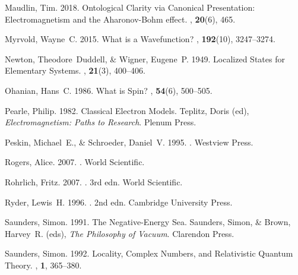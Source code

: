 \documentclass[12pt,secnumarabic,amsmath,amssymb,balancelastpage,nofootinbib]{article}
\begin{document}
\begin{thebibliography}{}
Maudlin, Tim. 2018.
\newblock Ontological Clarity via Canonical Presentation: Electromagnetism and
  the Aharonov-Bohm effect.
, {\bf 20}(6), 465.

Myrvold, Wayne~C. 2015.
\newblock What is a Wavefunction?
, {\bf 192}(10), 3247--3274.

Newton, Theodore~Duddell, \& Wigner, Eugene~P. 1949.
\newblock Localized States for Elementary Systems.
, {\bf 21}(3), 400--406.

Ohanian, Hans~C. 1986.
\newblock What is Spin?
, {\bf 54}(6), 500--505.

Pearle, Philip. 1982.
\newblock Classical Electron Models.
 Teplitz, Doris (ed), {\em Electromagnetism:
  Paths to Research}.
\newblock Plenum Press.

Peskin, Michael~E., \& Schroeder, Daniel~V. 1995.
.
\newblock Westview Press.

Rogers, Alice. 2007.
.
\newblock World Scientific.

Rohrlich, Fritz. 2007.
. 3rd edn.
\newblock World Scientific.

Ryder, Lewis~H. 1996.
. 2nd edn.
\newblock Cambridge University Press.

Saunders, Simon. 1991.
\newblock The Negative-Energy Sea.
 Saunders, Simon, \& Brown, Harvey~R. (eds),
  {\em The Philosophy of Vacuum}.
\newblock Clarendon Press.

Saunders, Simon. 1992.
\newblock Locality, Complex Numbers, and Relativistic Quantum Theory.
, {\bf 1}, 365--380.


\end{thebibliography}
\end{document}
